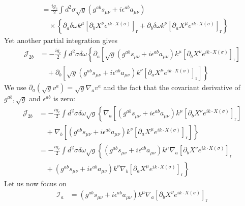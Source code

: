 \begin{tcolorbox}[breakable]
\begin{align}
			&= \frac{i g_c}{2} \int d^2 \sigma \sqrt{g}\left(g^{a b} s_{\mu \nu}+i \epsilon^{a b} a_{\mu \nu}\right) \nonumber \\
			&\quad \times\left\{\partial_a \delta \omega k^\mu\left[\partial_b X^\nu e^{i k \cdot X(\sigma)}\right]_{\mathrm{r}} + \partial_b \delta \omega k^\nu\left[\partial_a X^\mu e^{i k \cdot X(\sigma)}\right]_{\mathrm{r}}\right\}
		\end{align}
		Yet another partial integration gives
		\begin{align}
			\mathcal{J}_{2 b} &= -\frac{i g_c}{2} \int d^2 \sigma \delta \omega\left\{\partial_a\left[\sqrt{g}\left(g^{a b} s_{\mu \nu}+i \epsilon^{a b} a_{\mu \nu}\right) k^\mu\left[\partial_b X^\nu e^{i k \cdot X(\sigma)}\right]_{\mathrm{r}}\right]\right. \nonumber \\
			&\quad + \left.\partial_b\left[\sqrt{g}\left(g^{a b} s_{\mu \nu}+i \epsilon^{a b} a_{\mu \nu}\right) k^\nu\left[\partial_a X^\mu e^{i k \cdot X(\sigma)}\right]_{\mathrm{r}}\right]\right\}
		\end{align}
		We use $\partial_a\left(\sqrt{g} v^a\right)=\sqrt{g} \nabla_a v^a$ and the fact that the covariant derivative of $g^{a b}, \sqrt{g}$ and $\epsilon^{a b}$ is zero:
		\begin{align}
			\mathcal{J}_{2 b} &= -\frac{i g_c}{2} \int d^2 \sigma \delta \omega \sqrt{g}\left\{\nabla_a\left[\left(g^{a b} s_{\mu \nu}+i \epsilon^{a b} a_{\mu \nu}\right) k^\mu\left[\partial_b X^\nu e^{i k \cdot X(\sigma)}\right]_{\mathrm{r}}\right]\right. \nonumber \\
			&\quad + \left.\nabla_b\left[\left(g^{a b} s_{\mu \nu}+i \epsilon^{a b} a_{\mu \nu}\right) k^\nu\left[\partial_a X^\mu e^{i k \cdot X(\sigma)}\right]_{\mathrm{r}}\right]\right\} \nonumber \\
			&= -\frac{i g_c}{2} \int d^2 \sigma \delta \omega \sqrt{g}\left\{\left(g^{a b} s_{\mu \nu}+i \epsilon^{a b} a_{\mu \nu}\right) k^\mu \nabla_a\left[\partial_b X^\nu e^{i k \cdot X(\sigma)}\right]_{\mathrm{r}}\right. \nonumber \\
			&\quad + \left.\left(g^{a b} s_{\mu \nu}+i \epsilon^{a b} a_{\mu \nu}\right) k^\nu \nabla_b\left[\partial_a X^\mu e^{i k \cdot X(\sigma)}\right]_{\mathrm{r}}\right\}
		\end{align}
		Let us now focus on
		\begin{align}
			\mathcal{I}_a &= \left(g^{a b} s_{\mu \nu}+i \epsilon^{a b} a_{\mu \nu}\right) k^\mu \nabla_a\left[\partial_b X^\nu e^{i k \cdot X(\sigma)}\right]_{\mathrm{r}} \nonumber \\

\end{align}
\end{tcolorbox}
